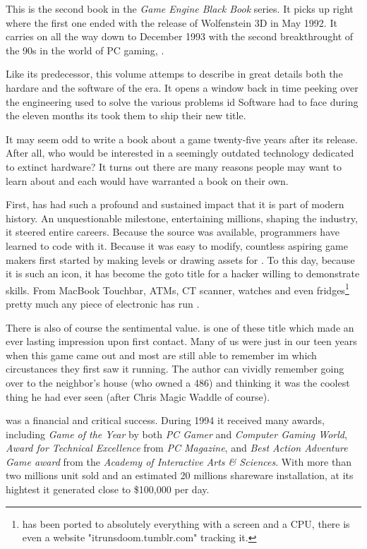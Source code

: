 This is the second book in the \textit{Game Engine Black Book} series. It picks up right where the first one ended with the release of Wolfenstein 3D in May 1992. It carries on all the way down to December 1993 with the second breakthrought of the 90s in the world of PC gaming, \doom.\\
\par
 Like its predecessor, this volume attemps to describe in great details both the hardare and the software of the era. It opens a window back in time peeking over the engineering used to solve the various problems id Software had to face during the eleven months its took them to ship their new title.\\%
\par
It may seem odd to write a book about a game twenty-five years after its release. After all, who would be interested in a seemingly outdated technology dedicated to extinct hardware? It turns out there are many reasons people may want to learn about \doom and each would have warranted a book on their own.\\ 
\par
First, \doom has had such a profound and sustained impact that it is part of modern history. An unquestionable milestone, entertaining millions, shaping the industry, it steered entire careers. Because the source was available, programmers have learned to code with it. Because it was easy to modify, countless aspiring game makers first started by making levels or drawing assets for \doom. To this day, because it is such an icon, it has become the goto title for a hacker willing to demonstrate skills. From MacBook Touchbar, ATMs, CT scanner, watches and even fridges\footnote{\doom has been ported to absolutely everything with a screen and a CPU, there is even a website "itrunsdoom.tumblr.com" tracking it.} pretty much any piece of electronic has run \doom.\\
\par


There is also of course the sentimental value. \doom is one of these title which made an ever lasting impression upon first contact. Many of us were just in our teen years when this game came out and most are still able to remember im which circustances they first saw it running. The author can vividly remember going over to the neighbor's house (who owned a 486) and thinking it was the coolest thing he had ever seen (after Chris Magic Waddle of course).\\
\par
\doom was a financial and critical success. During 1994 it received many awards, including \textit{Game of the Year} by both \textit{PC Gamer} and \textit{Computer Gaming World}, \textit{Award for Technical Excellence} from \textit{PC Magazine}, and \textit{Best Action Adventure Game award} from the \textit{Academy of Interactive Arts \& Sciences}. With more than two millions unit sold and an estimated 20 millions shareware installation, at its hightest it generated close to \$100,000 per day.\\
\par

